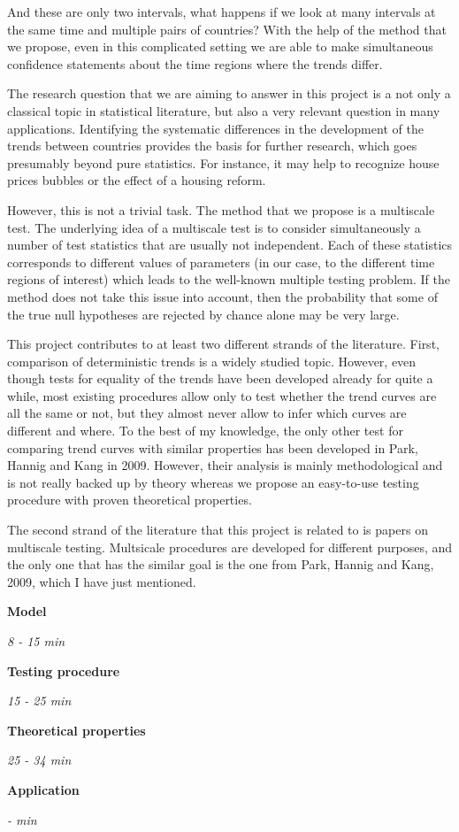 \documentclass[a4paper,12pt]{article}
\begin{document}
And these are only two intervals, what happens if we look at many intervals at the same time and multiple pairs of countries? With the help of the method that we propose, even in this complicated setting we are able to make simultaneous confidence statements about the time regions where the trends differ.

The research question that we are aiming to answer in this project is a not only a classical topic in statistical literature, but also a very relevant question in many applications. Identifying the systematic differences in the development of the trends between countries provides the basis for further research, which goes presumably beyond pure statistics. For instance, it may help to recognize house prices bubbles or the effect of a housing reform.

However, this is not a trivial task. The method that we propose is a multiscale test. The underlying idea of a multiscale test is to consider simultaneously a number of test statistics that are usually not independent. Each of these statistics corresponds to different values of parameters (in our case, to the different time regions of interest) which leads to the well-known multiple testing problem. If the method does not take this issue into account, then the probability that some of the true null hypotheses are rejected by chance alone may be very large.

This project contributes to at least two different strands of the literature. First, comparison of deterministic trends is a widely studied topic. However, even though tests for equality of the trends have been developed already for quite a while, most existing procedures allow only to test whether the trend curves are all the same or not, but they almost never allow to infer which curves are different and where. To the best of my knowledge, the only other test for comparing trend curves with similar properties has been developed in Park, Hannig and Kang in 2009. However, their analysis is mainly methodological and is not really backed up by theory whereas we propose an easy-to-use testing procedure with proven theoretical properties.

The second strand of the literature that this project is related to is papers on multiscale testing. Multsicale procedures are developed for different purposes, and the only one that has the similar goal is the one from Park, Hannig and Kang, 2009, which I have just mentioned.

\textbf{Model}

\emph{8 -  15 min}

\textbf{Testing procedure}

\emph{15 - 25 min}

\textbf{Theoretical properties}

\emph{ 25 - 34 min}

\textbf{Application}

 \emph{ -  min}
\end{document}
